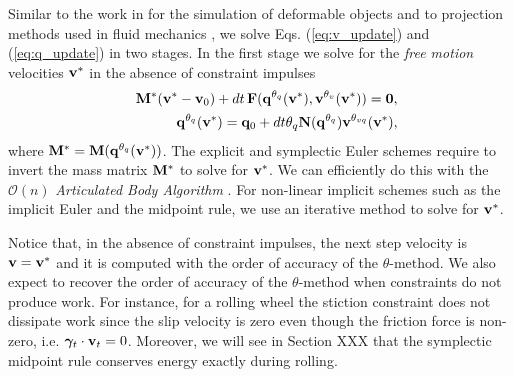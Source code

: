 Similar to the work in \cite{bib:duriez2005realistic} for the simulation of
deformable objects and to projection methods used in fluid mechanics
\cite{bib::bell1991efficient}, we solve Eqs. (\ref{eq:v_update}) and
(\ref{eq:q_update}) in two stages. In the first stage we solve for the
\textit{free motion} velocities ${\mathbf{v}}^*$ in the absence of constraint impulses
\begin{eqnarray}
	&&\mf{M}^*(\mf{v}^*-\mf{v}_0) + dt\,\mf{F}(\mf{q}^{\theta_q}(\mf{v}^*), \mf{v}^{\theta_v}(\mf{v}^*)) = \mf{0},
	\label{eq:vstar_definition}\\
	&&\mf{q}^{\theta_q}(\mf{v}^*) = \mf{q}_0 + dt\theta_q\mf{N}(\mf{q}^{\theta_{q}})\mf{v}^{\theta_{vq}}(\mf{v}^*),
	\label{eq:qstar_definition}
\end{eqnarray}
where ${\mathbf{M}}^* = {\mathbf{M}}({\mathbf{q}}^{\theta_q}({\mathbf{v}}^*))$. The explicit and
symplectic Euler schemes require to invert the mass matrix ${\mathbf{M}}^*$ to solve
for ${\mathbf{v}}^*$. We can efficiently do this with the $\mathcal{O}(n)$
\emph{Articulated Body Algorithm}
\cite{bib:featherstone2008_rigid_body_dynamics_algorithms}. For non-linear
implicit schemes such as the implicit Euler and the midpoint rule, we use an
iterative method to solve for ${\mathbf{v}}^*$.

Notice that, in the
absence of constraint impulses, the next step velocity is ${\mathbf{v}}={\mathbf{v}}^*$ and
it is computed with the order of accuracy of the $\theta\text{-method}$. We also
expect to recover the order of accuracy of the $\theta\text{-method}$ when
constraints do not produce work. For instance, for a rolling wheel the stiction
constraint does not dissipate work since the slip velocity is zero even though
the friction force is non-zero, i.e. ${\bm\gamma}_t\cdot{\mathbf{v}}_t = 0$. Moreover, we
will see in Section XXX that the symplectic midpoint rule conserves energy
exactly during rolling.

